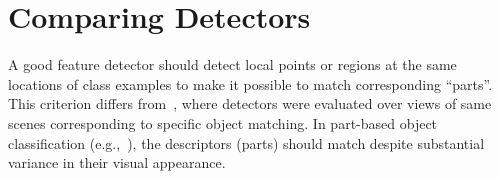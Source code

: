 \documentclass[10pt,journal,cspaper,compsoc]{IEEEtran}
\begin{document}
%





%
\section{Comparing Detectors\label{sec:detectorcomparison}}
%
A good feature detector should detect local points or regions at the same
locations of class examples to make it possible to match corresponding ``parts''.
This criterion differs from~\cite{MikTuySch:2005}, where detectors were evaluated 
over views of same scenes corresponding to
specific object matching. In part-based object classification (e.g.,~\cite{FelGirMca:2010}),
the descriptors (parts) should match despite substantial variance in their visual
appearance.
\end{document}
